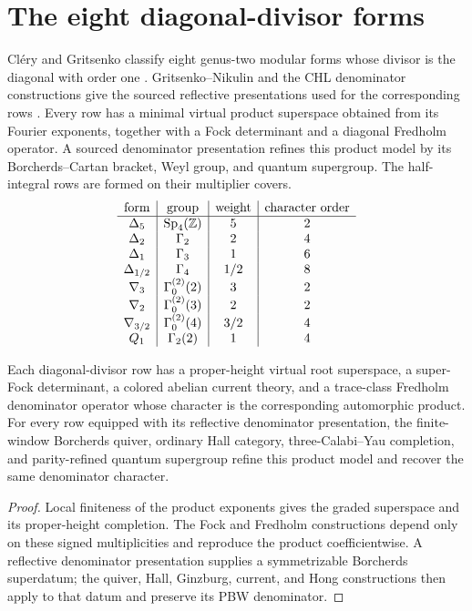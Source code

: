 \chapter{The eight diagonal-divisor forms}
Cl\'ery and Gritsenko classify eight genus-two modular forms whose divisor is the diagonal with order one \cite{GC}.  Gritsenko--Nikulin and the CHL denominator constructions give the sourced reflective presentations used for the corresponding rows \cite{GN97,GN98a,GN98b,GovindarajanKrishna2009,Govindarajan2011,GovindarajanSamanta2019}.  Every row has a minimal virtual product superspace obtained from its Fourier exponents, together with a Fock determinant and a diagonal Fredholm operator.  A sourced denominator presentation refines this product model by its Borcherds--Cartan bracket, Weyl group, and quantum supergroup.  The half-integral rows are formed on their multiplier covers.
\[
\begin{array}{c|c|c|c}
\text{form}&\text{group}&\text{weight}&\text{character order}\\ \hline
\Delta_5&\operatorname{Sp}_4(\mathbb Z)&5&2\\
\Delta_2&\Gamma_2&2&4\\
\Delta_1&\Gamma_3&1&6\\
\Delta_{1/2}&\Gamma_4&1/2&8\\
\nabla_3&\Gamma^{(2)}_0(2)&3&2\\
\nabla_2&\Gamma^{(2)}_0(3)&2&2\\
\nabla_{3/2}&\Gamma^{(2)}_0(4)&3/2&4\\
Q_1&\Gamma_2(2)&1&4
\end{array}
\]

\begin{theorem}
Each diagonal-divisor row has a proper-height virtual root superspace, a super-Fock determinant, a colored abelian current theory, and a trace-class Fredholm denominator operator whose character is the corresponding automorphic product.  For every row equipped with its reflective denominator presentation, the finite-window Borcherds quiver, ordinary Hall category, three-Calabi--Yau completion, and parity-refined quantum supergroup refine this product model and recover the same denominator character.
\end{theorem}
\begin{proof}
Local finiteness of the product exponents gives the graded superspace and its proper-height completion.  The Fock and Fredholm constructions depend only on these signed multiplicities and reproduce the product coefficientwise.  A reflective denominator presentation supplies a symmetrizable Borcherds superdatum; the quiver, Hall, Ginzburg, current, and Hong constructions then apply to that datum and preserve its PBW denominator.
\end{proof}

